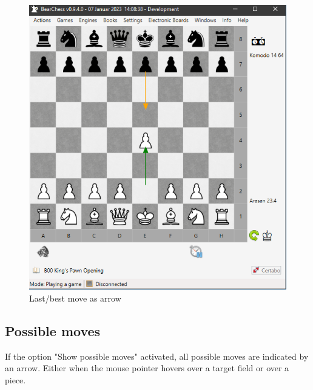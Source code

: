\documentclass[11pt,a4paper]{article}
\begin{document}
	
	\begin{figure}[H]
		\centering
		\includegraphics[scale=0.8]{LastMoveArrow.png}
		\caption{Last/best move as arrow}
		\label{fig:LastMove2}
	\end{figure}
	
	\subsection{Possible moves}
	If the option "Show possible moves" activated, all possible moves are indicated by an arrow.
	Either when the mouse pointer hovers over a target field or over a piece.
	
\end{document}
